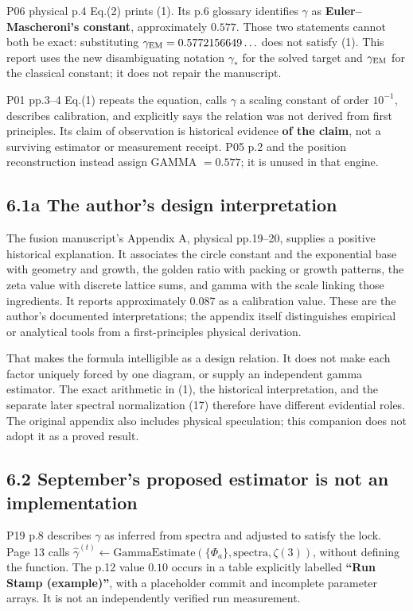 \documentclass[11pt,a4paper]{article}
\begin{document}
P06 physical p.4 Eq.(2) prints (1). Its p.6 glossary identifies $\gamma$ as \textbf{Euler--Mascheroni's constant}, approximately $0.577$. Those two statements cannot both be exact: substituting $\gamma_{\rm EM}=0.5772156649\ldots$ does not satisfy (1). This report uses the new disambiguating notation $\gamma_*$ for the solved target and $\gamma_{\rm EM}$ for the classical constant; it does not repair the manuscript.


P01 pp.3--4 Eq.(1) repeats the equation, calls $\gamma$ a scaling constant of order $10^{-1}$, describes calibration, and explicitly says the relation was not derived from first principles. Its claim of observation is historical evidence \textbf{of the claim}, not a surviving estimator or measurement receipt. P05 p.2 and the position reconstruction instead assign GAMMA $=0.577$; it is unused in that engine.



\subsection*{6.1a The author's design interpretation}

The fusion manuscript's Appendix A, physical pp.19--20, supplies a positive historical explanation. It associates the circle constant and the exponential base with geometry and growth, the golden ratio with packing or growth patterns, the zeta value with discrete lattice sums, and gamma with the scale linking those ingredients. It reports approximately 0.087 as a calibration value. These are the author's documented interpretations; the appendix itself distinguishes empirical or analytical tools from a first-principles physical derivation.


That makes the formula intelligible as a design relation. It does not make each factor uniquely forced by one diagram, or supply an independent gamma estimator. The exact arithmetic in (1), the historical interpretation, and the separate later spectral normalization (17) therefore have different evidential roles. The original appendix also includes physical speculation; this companion does not adopt it as a proved result.


\subsection*{6.2 September's proposed estimator is not an implementation}

P19 p.8 describes $\gamma$ as inferred from spectra and adjusted to satisfy the lock. Page 13 calls
$\widehat\gamma^{(t)}\leftarrow\mathrm{GammaEstimate}(\{\Phi_a\},\mathrm{spectra},\zeta(3))$,
without defining the function. The p.12 value $0.10$ occurs in a table explicitly labelled \textbf{``Run Stamp (example)''}, with a placeholder commit and incomplete parameter arrays. It is not an independently verified run measurement.
\end{document}
